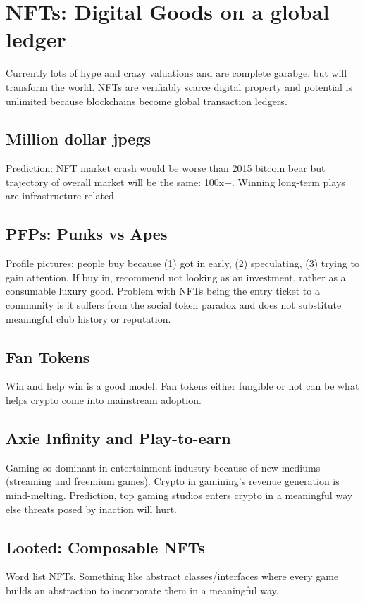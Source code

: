 \documentclass{../notes}
\begin{document}
\section{NFTs: Digital Goods on a global ledger}
Currently lots of hype and crazy valuations and are complete garabge, but will transform the world. NFTs are verifiably scarce digital property and potential is unlimited because blockchains become global transaction ledgers. 

\subsection{Million dollar jpegs}
Prediction: NFT market crash would be worse than 2015 bitcoin bear but trajectory of overall market will be the same: 100x+. Winning long-term plays are infrastructure related

\subsection{PFPs: Punks vs Apes}
Profile pictures: people buy because (1) got in early, (2) speculating, (3) trying to gain attention. If buy in, recommend not looking as an investment, rather as a consumable luxury good. Problem with NFTs being the entry ticket to a community is it suffers from the social token paradox and does not substitute meaningful club history or reputation. 

\subsection{Fan Tokens}
Win and help win is a good model. Fan tokens either fungible or not can be what helps crypto come into mainstream adoption.

\subsection{Axie Infinity and Play-to-earn}
Gaming so dominant in entertainment industry because of new mediums (streaming and freemium games). Crypto in gamining's revenue generation is mind-melting. Prediction, top gaming studios enters crypto in a meaningful way else threats posed by inaction will hurt. 

\subsection{Looted: Composable NFTs}
Word list NFTs. Something like abstract classes/interfaces where every game builds an abstraction to incorporate them in a meaningful way. 
\end{document}
